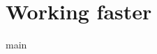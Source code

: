 \documentclass[oneside]{report}
\begin{document}
	\tableofcontents





	\chapter{Working faster}
		{main}
\end{document}
